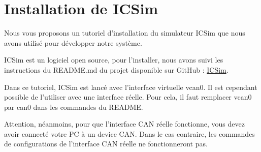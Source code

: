 \section{Installation de ICSim}

Nous vous proposons un tutoriel d'installation du simulateur ICSim que nous avons utilisé pour développer notre système.

ICSim est un logiciel open source, pour l'installer, nous avons suivi les instructions du README.md du projet disponible sur GitHub : \href{https://github.com/zombieCraig/ICSim}{ICSim}. 

\medspace

Dans ce tutoriel, ICSim est lancé avec l'interface virtuelle vcan0. Il est cependant possible de l'utiliser avec une interface réelle. Pour cela, il faut remplacer vcan0 par can0 dans les commandes du README. 

\medspace

Attention, néanmoins, pour que l'interface CAN réelle fonctionne, vous devez avoir connecté votre PC à un device CAN. Dans le cas contraire, les commandes de configurations de l'interface CAN réelle ne fonctionneront pas. 

\medspace

